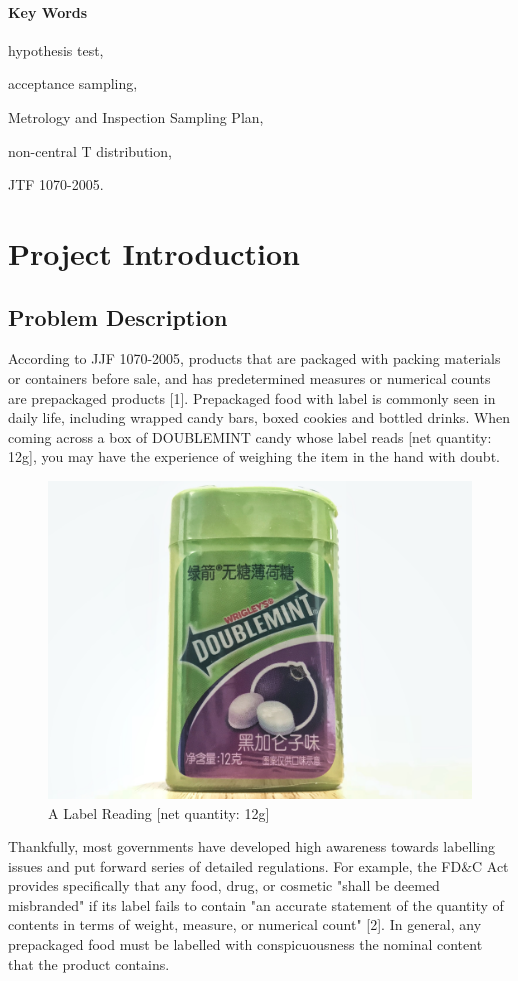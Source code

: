 \documentclass[a4paper]{article}
\begin{document}
\paragraph{Key Words} hypothesis test, 

acceptance sampling,

Metrology and Inspection Sampling Plan, 

non-central T distribution, 

JTF 1070-2005.


\newpage
\tableofcontents
\newpage
\listoffigures
\newpage
\listoftables
\newpage
\section{Project Introduction}
\subsection{Problem Description}
According to JJF 1070-2005, products that are packaged with packing materials or containers before sale, and has predetermined measures or numerical counts are prepackaged products [1]. Prepackaged food with label is commonly seen in daily life, including wrapped candy bars, boxed cookies and bottled drinks. When coming across a box of DOUBLEMINT candy whose label reads [net quantity: 12g], you may have the experience of weighing the item in the hand with doubt. 

\begin{figure}[!htbp]
\centering
\includegraphics[width=0.4
\linewidth,angle=0]{candy.jpg}
\caption{A Label Reading [net quantity: 12g]}
\end{figure}

Thankfully, most governments have developed high awareness towards labelling issues and put forward series of detailed regulations. For example, the FD\&C Act provides specifically that any food, drug, or cosmetic "shall be deemed misbranded" if its label fails to contain "an accurate statement of the quantity of contents in terms of weight, measure, or numerical count" [2]. In general, any prepackaged food must be labelled with conspicuousness the nominal content that the product contains.
\end{document}
